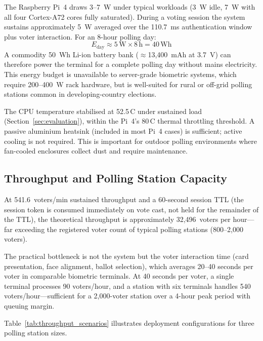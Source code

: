 \documentclass[conference]{IEEEtran}
\begin{document}
The Raspberry Pi~4 draws 3–7~W under typical workloads (3~W idle,
7~W with all four Cortex-A72 cores fully saturated). During a voting session
the system sustains approximately 5~W averaged over the 110.7~ms
authentication window plus voter interaction. For an 8-hour polling day:
\begin{equation}
  E_{\mathrm{day}} \approx 5\,\mathrm{W} \times 8\,\mathrm{h} = 40\,\mathrm{Wh}
\end{equation}
A commodity 50~Wh Li-ion battery bank ($\approx$13{,}400~mAh at 3.7~V)
can therefore power the terminal for a complete polling day without mains
electricity. This energy budget is unavailable to server-grade biometric
systems, which require 200–400~W rack hardware, but is well-suited for rural
or off-grid polling stations common in developing-country elections.

The CPU temperature stabilised at 52.5\,\textdegree{}C under sustained load
(Section~\ref{sec:evaluation}), within the Pi~4's 80\,\textdegree{}C thermal
throttling threshold. A passive aluminium heatsink (included in most Pi~4
cases) is sufficient; active cooling is not required. This is important for
outdoor polling environments where fan-cooled enclosures collect dust and
require maintenance.

\subsection{Throughput and Polling Station Capacity}
\label{sec:throughput}

At 541.6~voters/min sustained throughput and a 60-second session TTL (the
session token is consumed immediately on vote cast, not held for the
remainder of the TTL), the theoretical throughput is approximately
32{,}496~voters per hour—far exceeding the registered voter count of
typical polling stations (800–2{,}000 voters).

The practical bottleneck is not the system but the voter interaction time
(card presentation, face alignment, ballot selection), which averages 20–40
seconds per voter in comparable biometric terminals. At 40 seconds per voter,
a single terminal processes 90 voters/hour, and a station with six terminals
handles 540 voters/hour—sufficient for a 2{,}000-voter station over a 4-hour
peak period with queuing margin.

Table~\ref{tab:throughput_scenarios} illustrates deployment configurations for
three polling station sizes.
\end{document}
